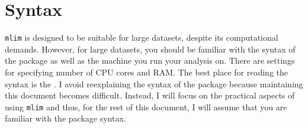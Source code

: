 \section{Syntax}

\texttt{mlim} is designed to be suitable for large datasets, despite its computational demands. However, for large datasets, you should be familiar with the syntax of the package as well as the machine you run your analysis on. There are settings for specifying number of CPU cores and RAM. The best place for reading the syntax is the . I avoid reexplaining the syntax of the package because maintaining this document becomes  difficult. Instead, I will focus on the practical aspects of using \texttt{mlim} and thus, for the rest of this document, I will assume that you are familiar with the package syntax. 
